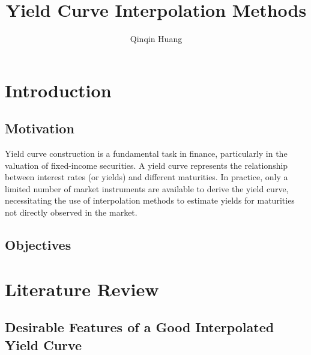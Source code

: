 \documentclass{article}
\title{Yield Curve Interpolation Methods}
\author{Qinqin Huang}
\begin{document}
\maketitle

\section{Introduction}

\subsection{Motivation}

Yield curve construction is a fundamental task in finance, particularly in the valuation of fixed-income securities. A yield curve represents the relationship between interest rates (or yields) and different maturities. In practice, only a limited number of market instruments are available to derive the yield curve, necessitating the use of interpolation methods to estimate yields for maturities not directly observed in the market. 



\subsection{Objectives}


\section{Literature Review}



\subsection{Desirable Features of a Good Interpolated Yield Curve}
\end{document}
